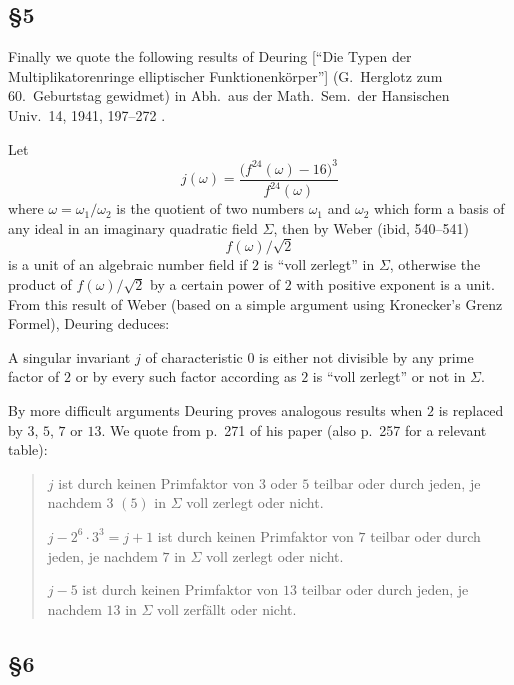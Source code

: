 \subsection*{\texorpdfstring{§5}{§5}}

Finally we quote the following results of Deuring [``Die Typen der
Multiplikatorenringe elliptischer Funktionenk\"orper''] (G.~Herglotz zum
60.~Geburtstag gewidmet) in Abh.\ aus der Math.\ Sem.\ der Hansischen
Univ.\ 14, 1941, 197--272 \cite{deuring1941typen}.

Let
\[
j(\omega)=\frac{\bigl(f^{24}(\omega)-16\bigr)^{3}}{f^{24}(\omega)}
\]
where $\omega=\omega_{1}/\omega_{2}$ is the quotient of two numbers
$\omega_{1}$ and $\omega_{2}$ which form a basis of any ideal in an
imaginary quadratic field $\Sigma$, then by Weber (ibid, 540--541)
\[
f(\omega)\big/\sqrt{2}
\]
is a unit of an algebraic number field if $2$ is ``voll zerlegt'' in
$\Sigma$, otherwise the product of $f(\omega)/\sqrt{2}$ by a certain power
of $2$ with positive exponent is a unit. From this result of Weber (based
on a simple argument using Kronecker's Grenz Formel), Deuring deduces:

A singular invariant $j$ of characteristic $0$ is either not divisible by
any prime factor of $2$ or by every such factor according as $2$ is
``voll zerlegt'' or not in $\Sigma$.

By more difficult arguments Deuring proves analogous results when $2$ is
replaced by $3$, $5$, $7$ or $13$. We quote from p.~271 of his paper
(also p.~257 for a relevant table):

\begin{quote}
$j$ ist durch keinen Primfaktor von $3$ oder $5$ teilbar oder durch
jeden, je nachdem $3$ $(5)$ in $\Sigma$ voll zerlegt oder nicht.

$j-2^{6}\cdot 3^{3}=j+1$ ist durch keinen Primfaktor von $7$ teilbar oder
durch jeden, je nachdem $7$ in $\Sigma$ voll zerlegt oder nicht.

$j-5$ ist durch keinen Primfaktor von $13$ teilbar oder durch jeden, je
nachdem $13$ in $\Sigma$ voll zerf\"allt oder nicht.
\end{quote}

\subsection*{\texorpdfstring{§6}{§6}}

